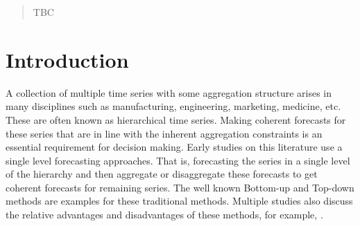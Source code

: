 \documentclass[12pt]{article}
\theoremstyle{definition}
\theoremstyle{property}
\begin{document}
	\bigskip
	
	
	\begin{abstract} TBC
	\end{abstract}
	
	
	\newpage
	
	\section{Introduction}\label{sec:intro}
	
	
	A collection of multiple time series with some aggregation structure arises in many disciplines such as manufacturing, engineering, marketing, medicine, etc. These are often known as hierarchical time series. Making coherent forecasts for these series that are in line with the inherent aggregation constraints is an essential requirement for decision making. Early studies on this literature use a single level forecasting approaches. That is, forecasting the series in a single level of the hierarchy and then aggregate or disaggregate these forecasts to get coherent forecasts for remaining series. The well known Bottom-up \citep{Dunn1976} and Top-down \citep{Gross1990, Athanasopoulos2009} methods are examples for these traditional methods. Multiple studies also discuss the relative advantages and disadvantages of these methods, for example, \citet{Schwarzkopf1988, Kahn1998, Lapide1998, Fliedner2001}. 
	
\end{document}
